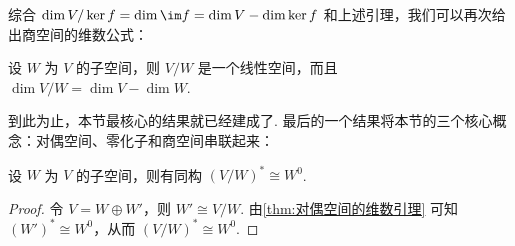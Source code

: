 综合 $\dim V/\ker f = \dim \im f = \dim V - \dim \ker f$ 和上述引理，我们可以再次给出商空间的维数公式：

\begin{corollary}{}{}
    设 $W$ 为 $V$ 的子空间，则 $V/W$ 是一个线性空间，而且 $\dim V/W = \dim V - \dim W$.
\end{corollary}

到此为止，本节最核心的结果就已经建成了. 最后的一个结果将本节的三个核心概念：对偶空间、零化子和商空间串联起来：

\begin{theorem}{}{}
    设 $W$ 为 $V$ 的子空间，则有同构 $(V/W)^* \cong W^0$.
\end{theorem}

\begin{proof}
    令 $V = W \oplus W'$，则 $W' \cong V/W$. 由\autoref{thm:对偶空间的维数引理} 可知 $(W')^* \cong W^0$，从而 $(V/W)^* \cong W^0$.
\end{proof}






